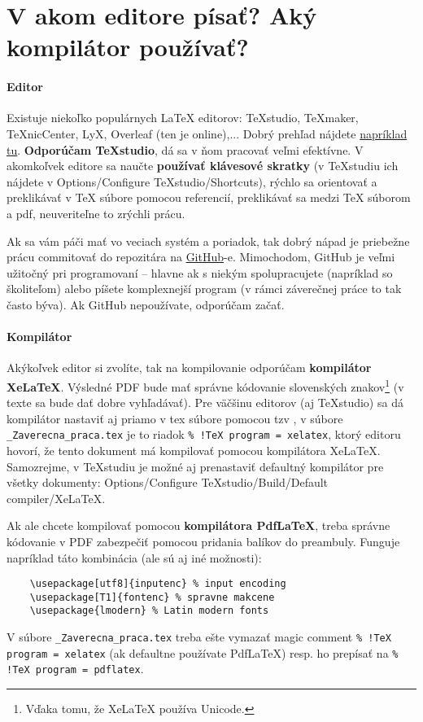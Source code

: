\chapter{V akom editore písať? Aký kompilátor používať?}\label{sec:aky_editor}

\subsubsection{Editor}
Existuje niekoľko populárnych LaTeX editorov: TeXstudio, TeXmaker, TeXnicCenter, LyX, Overleaf (ten je online),... Dobrý prehľad nájdete \href{https://beebom.com/best-latex-editors/}{napríklad tu}. \textbf{Odporúčam TeXstudio}, dá sa v ňom pracovať veľmi efektívne. V akomkoľvek editore sa naučte \textbf{používať klávesové skratky} (v TeXstudiu ich nájdete v Options/Configure TeXstudio/Shortcuts), rýchlo sa orientovať a preklikávať v TeX súbore pomocou referencií, preklikávať sa medzi TeX súborom a pdf, neuveriteľne to zrýchli prácu.

Ak sa vám páči mať vo veciach systém a poriadok, tak dobrý nápad je priebežne prácu commitovať do repozitára na \href{https://github.com/}{GitHub}-e. Mimochodom, GitHub je veľmi užitočný pri programovaní -- hlavne ak s niekým spolupracujete (napríklad so školiteľom) alebo píšete komplexnejší program (v rámci záverečnej práce to tak často býva). Ak GitHub nepoužívate, odporúčam začať.

\subsubsection{Kompilátor}
Akýkoľvek editor si zvolíte, tak na kompilovanie odporúčam \textbf{kompilátor XeLaTeX}. Výsledné PDF bude mať správne kódovanie slovenských znakov\footnote{Vďaka tomu, že XeLaTeX používa Unicode.} (v texte sa bude dať dobre vyhľadávať). Pre väčšinu editorov (aj TeXstudio) sa dá kompilátor nastaviť aj priamo v tex súbore pomocou tzv , v súbore \verb|_Zaverecna_praca.tex| je to riadok \verb|% !TeX program = xelatex|, ktorý editoru hovorí, že tento dokument má kompilovať pomocou kompilátora XeLaTeX. Samozrejme, v TeXstudiu je možné aj prenastaviť defaultný kompilátor pre všetky dokumenty: Options/Configure TeXstudio/Build/Default compiler/XeLaTeX.

Ak ale chcete kompilovať pomocou \textbf{kompilátora PdfLaTeX}, treba správne kódovanie v PDF zabezpečiť pomocou pridania balíkov do preambuly. Funguje napríklad táto kombinácia (ale sú aj iné možnosti):
\begin{verbatim}
	\usepackage[utf8]{inputenc} % input encoding
	\usepackage[T1]{fontenc} % spravne makcene
	\usepackage{lmodern} % Latin modern fonts
\end{verbatim}
V súbore \verb|_Zaverecna_praca.tex| treba ešte vymazať magic comment \verb|% !TeX program = xelatex| (ak defaultne používate PdfLaTeX) resp. ho prepísať na \verb|% !TeX program = pdflatex|.

